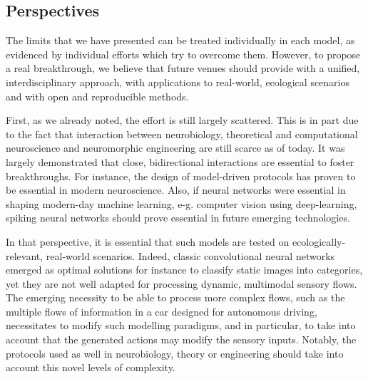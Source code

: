 \documentclass[brainsci, %
               review,submit,pdftex,moreauthors
               ]{Definitions/mdpi}
\begin{document}
\subsection{Perspectives}
%
The limits that we have presented can be treated individually in each model, as evidenced by individual efforts which try to overcome them. However, to propose a real breakthrough, we believe that future venues should provide with a unified, interdisciplinary approach, with applications to real-world, ecological scenarios and with open and reproducible methods. 

First, as we already noted, the effort is still largely scattered. This is in part due to the fact that interaction between neurobiology, theoretical and computational neuroscience and neuromorphic engineering are still scarce as of today. It was largely demonstrated that close, bidirectional interactions are essential to foster breakthroughs. For instance, the design of model-driven protocols has proven to be essential in modern neuroscience. Also, if neural networks were essential in shaping modern-day machine learning, e-g. computer vision using deep-learning, spiking neural networks should prove essential in future emerging technologies.

In that perspective, it is essential that such models are tested on ecologically-relevant, real-world scenarios. Indeed, classic convolutional neural networks emerged as optimal solutions for instance to classify static images into categories, yet they are not well adapted for processing dynamic, multimodal sensory flows. The emerging necessity to be able to process more complex flows, such as the multiple flows of information in a car designed for autonomous driving, necessitates to modify such modelling paradigms, and in particular, to take into account that the generated actions may modify the sensory inputs. Notably, the protocols used as well in neurobiology, theory or engineering should take into account this novel levels of complexity.
\end{document}
